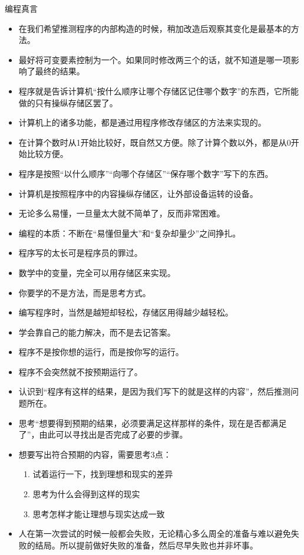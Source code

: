 \begin{frame}
\begin{block}{编程真言}
\begin{itemize}
      \item 在我们希望推测程序的内部构造的时候，稍加改造后观察其变化是最基本的方法。
      \item 最好将可变要素控制为一个。如果同时修改两三个的话，就不知道是哪一项影响了最终的结果。
      \item 程序就是告诉计算机“按什么顺序让哪个存储区记住哪个数字”的东西，它所能做的只有操纵存储区罢了。
      \item 计算机上的诸多功能，都是通过用程序修改存储区的方法来实现的。
      \item 在计算个数时从1开始比较好，既自然又方便。除了计算个数以外，都是从0开始比较方便。
      \item 程序是按照“以什么顺序”“向哪个存储区”“保存哪个数字”写下的东西。
      \item 计算机是按照程序中的内容操纵存储区，让外部设备运转的设备。
      \item 无论多么易懂，一旦量太大就不简单了，反而非常困难。
      \item 编程的本质：不断在“易懂但量大”和“复杂却量少”之间挣扎。
      \item 程序写的太长可是程序员的罪过。
      \item 数学中的变量，完全可以用存储区来实现。
      \item 你要学的不是方法，而是思考方式。
      \item 编写程序时，当然是越短却轻松，存储区用得越少越轻松。
      \item 学会靠自己的能力解决，而不是去记答案。
      \item 程序不是按你想的运行，而是按你写的运行。
      \item 程序不会突然就不按预期运行了。
      \item 认识到“程序有这样的结果，是因为我们写下的就是这样的内容”，然后推测问题所在。
      \item 思考“想要得到预期的结果，必须要满足这样那样的条件，现在是否都满足了”，由此可以寻找出是否完成了必要的步骤。
      \item 想要写出符合预期的内容，需要思考3点：
        \begin{enumerate}
          \item 试着运行一下，找到理想和现实的差异
          \item 思考为什么会得到这样的现实
          \item 思考怎样才能让理想与现实达成一致
        \end{enumerate}
      \item 人在第一次尝试的时候一般都会失败，无论精心多么周全的准备与难以避免失败的结局。所以提前做好失败的准备，然后尽早失败也并非坏事。

\end{itemize}
\end{block}
\end{frame}
